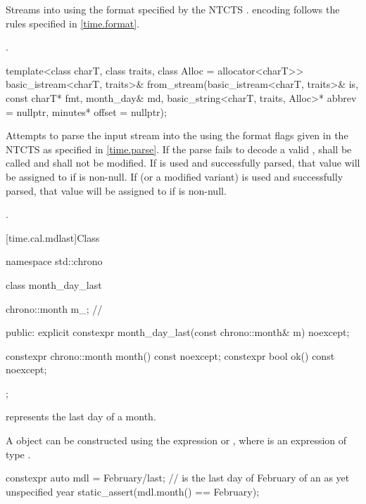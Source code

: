 \begin{itemdescr}
\pnum
\effects
Streams  into  using
the format specified by the NTCTS .
 encoding follows the rules specified in \ref{time.format}.

\pnum
\returns {}.
\end{itemdescr}

%
\begin{itemdecl}
template<class charT, class traits, class Alloc = allocator<charT>>
  basic_istream<charT, traits>&
    from_stream(basic_istream<charT, traits>& is, const charT* fmt,
                month_day& md, basic_string<charT, traits, Alloc>* abbrev = nullptr,
                minutes* offset = nullptr);
\end{itemdecl}

\begin{itemdescr}
\pnum
\effects
Attempts to parse the input stream 
into the   using
the format flags given in the NTCTS 
as specified in \ref{time.parse}.
If the parse fails to decode a valid ,
 shall be called
and  shall not be modified.
If  is used and successfully parsed,
that value will be assigned to  if  is non-null.
If  (or a modified variant) is used and successfully parsed,
that value will be assigned to  if  is non-null.

\pnum
\returns {}.
\end{itemdescr}

[time.cal.mdlast]{Class }

\begin{codeblock}
namespace std::chrono {
  class month_day_last {
    chrono::month m_;                   // \expos

  public:
    explicit constexpr month_day_last(const chrono::month& m) noexcept;

    constexpr chrono::month month() const noexcept;
    constexpr bool ok() const noexcept;
  };
}
\end{codeblock}

\pnum
{} represents the last day of a month.

\pnum
\begin{note}
A  object
can be constructed using the expression  or ,
where  is an expression of type .
\end{note}
\begin{example}
\begin{codeblock}
constexpr auto mdl = February/last;     //  is the last day of February of an as yet unspecified year
static_assert(mdl.month() == February);
\end{codeblock}
\end{example}

